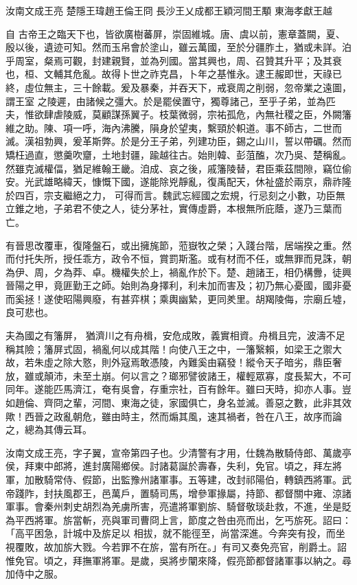 
\begin{pinyinscope}
汝南文成王亮
 楚隱王瑋趙王倫王冏
 長沙王乂成都王穎河間王顒
 東海孝獻王越



 自
 古帝王之臨天下也，皆欲廣樹蕃屏，崇固維城。唐、虞以前，憲章蓋闕，夏、殷以後，遺迹可知。然而玉帛會於塗山，雖云萬國，至於分疆胙土，猶或未詳。泊乎周室，粲焉可觀，封建親賢，並為列國。當其興也，周、召贊其升平；及其衰也，桓、文輔其危亂。故得卜世之祚克昌，卜年之基惟永。逮王赧即世，天祿已終，虛位無主，三十餘載。爰及暴秦，并吞天下，戒衰周之削弱，忽帝業之遠圖，謂王室
 之陵遲，由諸候之彊大。於是罷侯置守，獨尊諸己，至乎子弟，並為匹夫，惟欲肆虐陵威，莫顧謀孫翼子。枝葉微弱，宗祐孤危，內無社稷之臣，外闕籓維之助。陳、項一呼，海內沸騰，隕身於望夷，繫頸於軹道。事不師古，二世而滅。漢祖勃興，爰革斯弊。於是分王子弟，列建功臣，錫之山川，誓以帶礪。然而矯枉過直，懲羹吹齏，土地封疆，踰越往古。始則韓、彭菹醢，次乃吳、楚稱亂。然雖克滅權偪，猶足維翰王畿。洎成、哀之後，戚籓陵替，君臣乘茲間隙，竊位偷安。光武雄略緯天，慷慨下國，遂能除兇靜亂，復禹配天，休祉盛於兩京，鼎祚隆於四百，宗支繼絕之力，
 可得而言。魏武忘經國之宏規，行忌刻之小數，功臣無立錐之地，子弟君不使之人，徒分茅社，實傳虛爵，本根無所庇蔭，遂乃三葉而亡。



 有晉思改覆車，復隆盤石，或出擁旄節，蒞嶽牧之榮；入踐台階，居端揆之重。然而付托失所，授任乖方，政令不恒，賞罰斯濫。或有材而不任，或無罪而見誅，朝為伊、周，夕為莽、卓。機權失於上，禍亂作於下。楚、趙諸王，相仍構釁，徒興晉陽之甲，竟匪勤王之師。始則為身擇利，利未加而害及；初乃無心憂國，國非憂而奚拯！遂使昭陽興廢，有甚弈棋；乘輿幽縶，更同羑里。胡羯陵侮，宗廟丘墟，良可悲也。



 夫為國之有籓屏，
 猶濟川之有舟楫，安危成敗，義實相資。舟楫且完，波濤不足稱其險；籓屏式固，禍亂何以成其階！向使八王之中，一籓繄賴，如梁王之禦大故，若朱虛之除大憝，則外寇焉敢憑陵，內難奚由竊發！縱令天子暗劣，鼎臣奢放，雖或顛沛，未至土崩。何以言之？瑯邪譬彼諸王，權輕眾寡，度長絜大，不可同年。遂能匹馬濟江，奄有吳會，存重宗社，百有餘年。雖曰天時，抑亦人事。豈如趙倫、齊冏之輩，河間、東海之徒，家國俱亡，身名並滅。善惡之數，此非其效歟！西晉之政亂朝危，雖由時主，然而煽其風，速其禍者，咎在八王，故序而論之，總為其傳云耳。



 汝南文成王亮，字子翼，宣帝第四子也。少清警有才用，仕魏為散騎侍郎、萬歲亭侯，拜東中郎將，進封廣陽鄉侯。討諸葛誕於壽春，失利，免官。頃之，拜左將軍，加散騎常侍、假節，出監豫州諸軍事。五等建，改封祁陽伯，轉鎮西將軍。武帝踐阼，封扶風郡王，邑萬戶，置騎司馬，增參軍掾屬，持節、都督關中雍、涼諸軍事。會秦州刺史胡烈為羌虜所害，亮遣將軍劉旂、騎督敬琰赴救，不進，坐是貶為平西將軍。旂當斬，亮與軍司曹冏上言，節度之咎由亮而出，乞丐旂死。詔曰：「高平困急，計城中及旂足以
 相拔，就不能徑至，尚當深進。今奔突有投，而坐視覆敗，故加旂大戮。今若罪不在旂，當有所在。」有司又奏免亮官，削爵土。詔惟免官。頃之，拜撫軍將軍。是歲，吳將步闡來降，假亮節都督諸軍事以納之。尋加侍中之服。




\end{pinyinscope}
